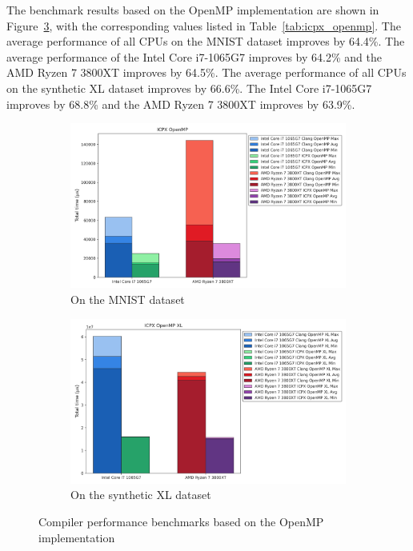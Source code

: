 \documentclass[modern,longauthor]{aastex7}
\begin{document}
The benchmark results based on the OpenMP implementation are shown in Figure~\ref{fig:icpx_openmp}, with the corresponding values listed in Table~\ref{tab:icpx_openmp}. The average performance of all CPUs on the MNIST dataset improves by 64.4\%. The average performance of the Intel Core i7-1065G7 improves by 64.2\% and the AMD Ryzen 7 3800XT improves by 64.5\%. The average performance of all CPUs on the synthetic XL dataset improves by 66.6\%. The Intel Core i7-1065G7 improves by 68.8\% and the AMD Ryzen 7 3800XT improves by 63.9\%.
\begin{figure}[htb!]
\centering
\begin{subfigure}{.5\textwidth}
  \centering
  \includegraphics[width=\linewidth]{Graphs/ICPX OpenMP.png}
  \caption{On the MNIST dataset}
 \label{fig:icpx_openmp_mnist}
\end{subfigure}%
\begin{subfigure}{.5\textwidth}
  \centering
  \includegraphics[width=\linewidth]{Graphs/ICPX OpenMP XL.png}
  \caption{On the synthetic XL dataset}
 \label{fig:icpx_openmp_xl}
\end{subfigure}
\caption{Compiler performance benchmarks based on the OpenMP implementation}
\label{fig:icpx_openmp}
\end{figure}
\end{document}
